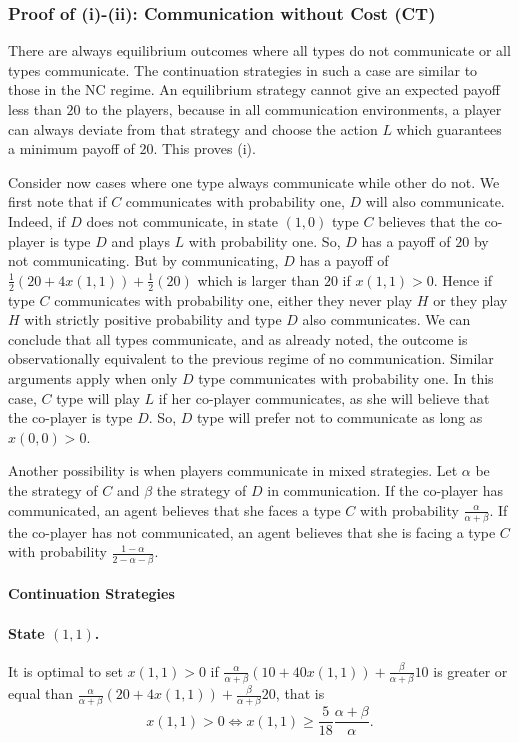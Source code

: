 \documentclass[12pt]{article}
\theoremstyle{break}
\begin{document}
\subsubsection*{Proof of (i)-(ii): Communication without Cost (CT)}
There are always equilibrium outcomes where all types do not communicate or all types communicate. The continuation strategies in such a case are similar to those in the NC regime. An equilibrium strategy cannot give an expected payoff less than $20$ to the players, because in all communication environments, a player can always deviate from that strategy and choose the action $L$ which guarantees a minimum payoff of $20$. This proves (i).

Consider now cases where one type always communicate while other do not. We first note that if $C$ communicates with probability one, $D$ will also communicate. Indeed, if $D$ does not communicate, in state $(1,0)$ type $C$ believes that the co-player is type $D$ and plays $L$ with probability one. So, $D$ has a payoff of $20$ by not communicating. But by communicating, $D$ has a payoff of $\frac{1}{2}(20+4x(1,1))+\frac{1}{2}(20)$ which is larger than $20$ if $x(1,1)>0$. Hence if type $C$ communicates with probability one, either they never play $H$ or they play $H$ with strictly positive probability and type $D$ also communicates. We can conclude that all types communicate, and as already noted, the outcome is observationally equivalent to the previous regime of no communication. Similar arguments apply when only $D$ type communicates with probability one. In this case, $C$ type will play $L$ if her co-player communicates, as she will believe that the co-player is type $D$. So, $D$ type will prefer not to communicate as long as $x(0,0)>0$.

Another possibility is when players communicate in mixed strategies. Let $\alpha$ be the strategy of $C$ and $\beta$ the strategy of $D$ in communication. If the co-player has communicated, an agent believes that she faces a type $C$ with probability $\frac{\alpha}{\alpha+\beta}$. If the co-player has not communicated, an agent believes that she is facing a type $C$ with probability $\frac{1-\alpha}{2-\alpha-\beta}$.

\paragraph{Continuation Strategies}

\paragraph{State $(1,1)$.} It is optimal to set $x(1,1)>0$ if $\frac{\alpha}{\alpha+\beta}(10+40x(1,1))+\frac{\beta}{\alpha+\beta}10$ is greater or equal than $\frac{\alpha}{\alpha+\beta}(20+4x(1,1))+\frac{\beta}{\alpha+\beta}20$, that is 
\begin{equation}\label{CWC-BR11}
	x(1,1)>0 \Leftrightarrow x(1,1)\geq \frac{5}{18}\frac{\alpha+\beta}{\alpha}.
\end{equation}
\end{document}
